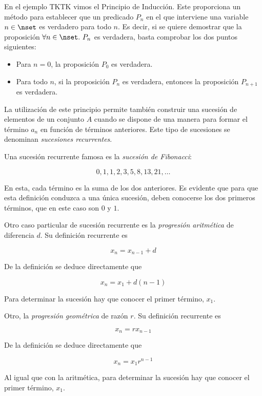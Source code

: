 

En el ejemplo TKTK vimos el Principio de Inducción. Este proporciona un
método para establecer que un predicado $P_n$ en el que interviene una
variable $n \in \nset$ es verdadero para todo $n$. Es decir, si se quiere
demostrar que la proposición $\forall n \in \nset.\ P_n$ es verdadera,
basta comprobar los dos puntos siguientes:

\begin{itemize}
  \item Para $n = 0$, la proposición $P_0$ es verdadera.

  \item Para todo $n$, si la proposición $P_n$ es verdadera, entonces la
    proposición $P_{n+1}$ es verdadera.
\end{itemize}

La utilización de este principio permite también construir una sucesión de
elementos de un conjunto $A$ cuando se dispone de una manera para formar el
término $a_n$ en función de términos anteriores. Este tipo de sucesiones se
denominan \emph{sucesiones recurrentes}.

\begin{example}
  Una sucesión recurrente famosa es la \emph{sucesión de Fibonacci}:

  \[ 0, 1, 1, 2, 3, 5, 8, 13, 21, \dots \]

  \noindent En esta, cada término es la suma de los dos anteriores. Es
  evidente que para que esta definición conduzca a una única sucesión, deben
  conocerse los dos primeros términos, que en este caso son $0$ y $1$.

  Otro caso particular de sucesión recurrente es la \emph{progresión
  aritmética} de diferencia $d$. Su definición recurrente es

  \[ x_n = x_{n-1} + d \]

  De la definición se deduce directamente que

  \[ x_n = x_1 + d(n-1) \]


  Para determinar la sucesión hay que conocer el primer término, $x_1$.

  Otro, la \emph{progresión geométrica} de razón $r$. Su definición
  recurrente es

  \[ x_n = r x_{n-1} \]

  De la definición se deduce directamente que

  \[ x_n = x_1 r^{n-1} \]

  Al igual que con la aritmética, para determinar la sucesión hay que
  conocer el primer término, $x_1$.
\end{example}


